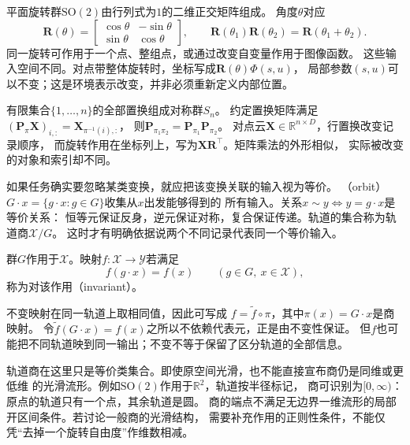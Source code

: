 平面旋转群$\mathrm{SO}(2)$由行列式为$1$的二维正交矩阵组成。
角度$\theta$对应
\begin{equation}
 \bm R(\theta)=
 \begin{bmatrix}\cos\theta&-\sin\theta\\\sin\theta&\cos\theta\end{bmatrix},
 \qquad
 \bm R(\theta_1)\bm R(\theta_2)=\bm R(\theta_1+\theta_2).
 \label{eq:geometry-planar-rotation-group}
\end{equation}
同一旋转可作用于一个点、整组点，或通过改变自变量作用于图像函数。
这些输入空间不同。对点带整体旋转时，坐标写成$\bm R(\theta)\Phi(s,u)$，
局部参数$(s,u)$可以不变；这是环境表示改变，并非必须重新定义内部位置。

有限集合$\{1,\ldots,n\}$的全部置换组成对称群$S_n$。
约定置换矩阵满足$(\bm P_\pi\bm X)_{i,:}=\bm X_{\pi^{-1}(i),:}$，
则$\bm P_{\pi_1\pi_2}=\bm P_{\pi_1}\bm P_{\pi_2}$。
对点云$\bm X\in\mathbb R^{n\times D}$，行置换改变记录顺序，
而旋转作用在坐标列上，写为$\bm X\bm R^\top$。矩阵乘法的外形相似，
实际被改变的对象和索引却不同。

如果任务确实要忽略某类变换，就应把该变换关联的输入视为等价。
（orbit）$G\cdot x=\{g\cdot x:g\in G\}$收集从$x$出发能够得到的
所有输入。关系$x\sim y\Longleftrightarrow y=g\cdot x$是等价关系：
恒等元保证反身，逆元保证对称，复合保证传递。轨道的集合称为轨道商$\mathcal X/G$。
这时才有明确依据说两个不同记录代表同一个等价输入。

\begin{definition}[不变映射]
\label{def:geometry-invariant-map}
群$G$作用于$\mathcal X$。映射$f:\mathcal X\to\mathcal Y$若满足
\begin{equation}
 f(g\cdot x)=f(x)\qquad(g\in G,\ x\in\mathcal X),
 \label{eq:geometry-invariant-map}
\end{equation}
称为对该作用（invariant）。
\end{definition}
不变映射在同一轨道上取相同值，因此可写成
$f=\widetilde f\circ\pi$，其中$\pi(x)=G\cdot x$是商映射。
令$\widetilde f(G\cdot x)=f(x)$之所以不依赖代表元，正是由不变性保证。
但$f$也可能把不同轨道映到同一输出；不变不等于保留了区分轨道的全部信息。

轨道商在这里只是等价类集合。即使原空间光滑，也不能直接宣布商仍是同维或更低维
的光滑流形。例如$\mathrm{SO}(2)$作用于$\mathbb R^2$，轨道按半径标记，
商可识别为$[0,\infty)$：原点的轨道只有一个点，其余轨道是圆。
商的端点不满足无边界一维流形的局部开区间条件。若讨论一般商的光滑结构，
需要补充作用的正则性条件，不能仅凭“去掉一个旋转自由度”作维数相减。

